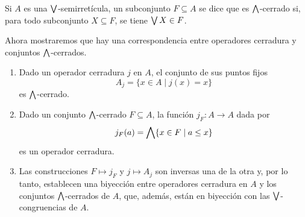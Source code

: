 \begin{defn}
    Si $A$ es una $\bigvee$-semirretícula,
    un subconjunto $F\subseteq A$ se dice que es $\bigwedge$-cerrado si,
    para todo subconjunto $X\subseteq F$, se tiene $\bigvee X\in F$.
\end{defn}

Ahora mostraremos que hay una correspondencia entre operadores
cerradura y conjuntos $\bigwedge$-cerrados.

\begin{lemma}\leavevmode
  \begin{enumerate}
    \item
    Dado un operador cerradura $j$ en $A$, el conjunto de sus
    puntos fijos
    \[
        A_j = \{x\in A \mid j(x) = x\}
    \]
    es $\bigwedge$-cerrado.
    \item
    Dado un conjunto $\bigwedge$-cerrado $F\subseteq A$, la función
    $j_F:A\to A$ dada por
    \[
        j_F(a) = \bigwedge\{x\in F \mid a\leq x\}
    \]
    es un operador cerradura.
    \item
    Las construcciones $F\mapsto j_F$
    y $j\mapsto A_j$ son inversas una de la otra y, por lo tanto,
    establecen una biyección entre operadores
    cerradura en $A$ y los conjuntos $\bigwedge$-cerrados de $A$, que,
    además, están en biyección con las $\bigvee$-congruencias de
    $A$.
  \end{enumerate}
\end{lemma}

